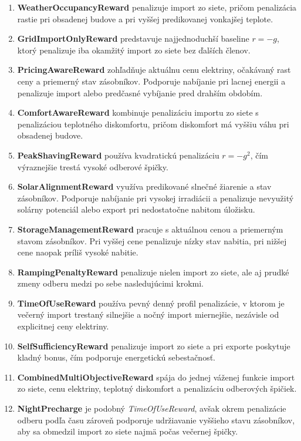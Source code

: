 \documentclass[conference]{IEEEtran}
\begin{document}
\begin{enumerate}
\item \textbf{WeatherOccupancyReward} penalizuje import zo siete, pričom penalizácia rastie pri obsadenej budove a pri vyššej predikovanej vonkajšej teplote.

\item \textbf{GridImportOnlyReward} predstavuje najjednoduchší baseline $r=-g$, ktorý penalizuje iba okamžitý import zo siete bez ďalších členov.

\item \textbf{PricingAwareReward} zohľadňuje aktuálnu cenu elektriny, očakávaný rast ceny a priemerný stav zásobníkov. Podporuje nabíjanie pri lacnej energii a penalizuje import alebo predčasné vybíjanie pred drahším obdobím.

\item \textbf{ComfortAwareReward} kombinuje penalizáciu importu zo siete s penalizáciou teplotného diskomfortu, pričom diskomfort má vyššiu váhu pri obsadenej budove.

\item \textbf{PeakShavingReward} používa kvadratickú penalizáciu $r=-g^2$, čím výraznejšie trestá vysoké odberové špičky.

\item \textbf{SolarAlignmentReward} využíva predikované slnečné žiarenie a stav zásobníkov. Podporuje nabíjanie pri vysokej irradiácii a penalizuje nevyužitý solárny potenciál alebo export pri nedostatočne nabitom úložisku.

\item \textbf{StorageManagementReward} pracuje s aktuálnou cenou a priemerným stavom zásobníkov. Pri vyššej cene penalizuje nízky stav nabitia, pri nižšej cene naopak príliš vysoké nabitie.

\item \textbf{RampingPenaltyReward} penalizuje nielen import zo siete, ale aj prudké zmeny odberu medzi po sebe nasledujúcimi krokmi.

\item \textbf{TimeOfUseReward} používa pevný denný profil penalizácie, v ktorom je večerný import trestaný silnejšie a nočný import miernejšie, nezávisle od explicitnej ceny elektriny.

\item \textbf{SelfSufficiencyReward} penalizuje import zo siete a pri exporte poskytuje kladný bonus, čím podporuje energetickú sebestačnosť.

\item \textbf{CombinedMultiObjectiveReward} spája do jednej váženej funkcie import zo siete, cenu elektriny, teplotný diskomfort a penalizáciu odberových špičiek.

\item \textbf{NightPrecharge} je podobný \textit{TimeOfUseReward}, avšak okrem penalizácie odberu podľa času zároveň podporuje udržiavanie vyššieho stavu zásobníkov, aby sa obmedzil import zo siete najmä počas večernej špičky.

\end{enumerate}
\end{document}
